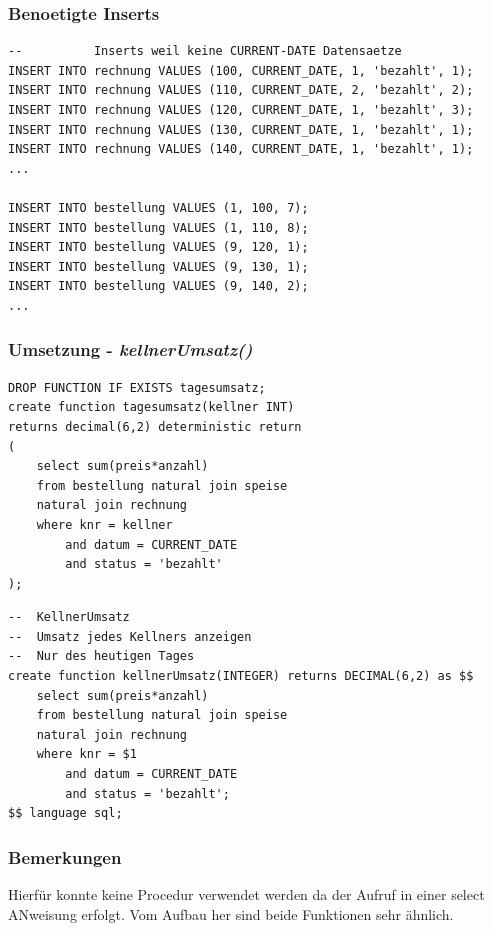 \subsubsection{Benoetigte Inserts}
\begin{lstlisting}[style=sql1, caption={inserts Au03 - MySQL}]
--			Inserts weil keine CURRENT-DATE Datensaetze
INSERT INTO rechnung VALUES (100, CURRENT_DATE, 1, 'bezahlt', 1);
INSERT INTO rechnung VALUES (110, CURRENT_DATE, 2, 'bezahlt', 2);
INSERT INTO rechnung VALUES (120, CURRENT_DATE, 1, 'bezahlt', 3);
INSERT INTO rechnung VALUES (130, CURRENT_DATE, 1, 'bezahlt', 1);
INSERT INTO rechnung VALUES (140, CURRENT_DATE, 1, 'bezahlt', 1);
...

INSERT INTO bestellung VALUES (1, 100, 7);
INSERT INTO bestellung VALUES (1, 110, 8);
INSERT INTO bestellung VALUES (9, 120, 1);
INSERT INTO bestellung VALUES (9, 130, 1);
INSERT INTO bestellung VALUES (9, 140, 2);
...
\end{lstlisting}
\subsubsection{Umsetzung - \textit{kellnerUmsatz()}}
\vspace{0.3cm}
\begin{minipage}{.5\textwidth}
	\begin{lstlisting}[style=sql1, caption={kellnerUmsatz() - MySQL}]
DROP FUNCTION IF EXISTS tagesumsatz;
create function tagesumsatz(kellner INT)
returns decimal(6,2) deterministic return
(
	select sum(preis*anzahl) 
	from bestellung natural join speise 
	natural join rechnung 
	where knr = kellner
		and datum = CURRENT_DATE 
		and status = 'bezahlt'
);	\end{lstlisting}
\end{minipage}%
\begin{minipage}{.5\textwidth}
	\begin{lstlisting}[style=sql, caption={kellnerUmsatz() - PSQL}]
--	KellnerUmsatz
--	Umsatz jedes Kellners anzeigen
--	Nur des heutigen Tages
create function kellnerUmsatz(INTEGER) returns DECIMAL(6,2) as $$
	select sum(preis*anzahl)
	from bestellung natural join speise 
	natural join rechnung 
	where knr = $1
		and datum = CURRENT_DATE 
		and status = 'bezahlt';
$$ language sql;	\end{lstlisting}
\end{minipage}

\subsubsection{Bemerkungen}
Hierfür konnte keine Procedur verwendet werden da der Aufruf in einer select ANweisung erfolgt. Vom Aufbau her sind beide Funktionen sehr ähnlich.

